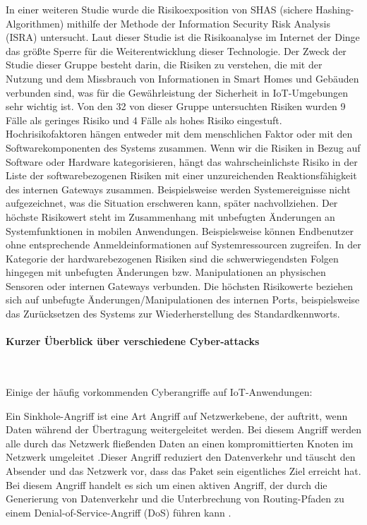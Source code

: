 In einer weiteren Studie \cite{JACOBSSON2016719} wurde die Risikoexposition von SHAS (sichere Hashing-Algorithmen) mithilfe der Methode der Information Security Risk Analysis (ISRA) untersucht.
Laut dieser Studie ist die Risikoanalyse im Internet der Dinge das größte Sperre für die Weiterentwicklung dieser Technologie. Der Zweck der Studie dieser Gruppe besteht darin, die Risiken zu verstehen, die mit der Nutzung und dem Missbrauch von Informationen in Smart Homes und Gebäuden verbunden sind, was für die Gewährleistung der Sicherheit in IoT-Umgebungen sehr wichtig ist. Von den 32 von dieser Gruppe untersuchten Risiken wurden 9 Fälle als geringes Risiko und 4 Fälle als hohes Risiko eingestuft. Hochrisikofaktoren hängen entweder mit dem menschlichen Faktor oder mit den Softwarekomponenten des Systems zusammen. 
Wenn wir die Risiken in Bezug auf Software oder Hardware kategorisieren, hängt das wahrscheinlichste Risiko in der Liste der softwarebezogenen Risiken mit einer unzureichenden Reaktionsfähigkeit des internen Gateways zusammen. Beispielsweise werden Systemereignisse nicht aufgezeichnet, was die Situation erschweren kann, später nachvollziehen. Der höchste Risikowert steht im Zusammenhang mit unbefugten Änderungen an Systemfunktionen in mobilen Anwendungen. Beispielsweise können Endbenutzer ohne entsprechende Anmeldeinformationen auf Systemressourcen zugreifen.
In der Kategorie der hardwarebezogenen Risiken sind die schwerwiegendsten Folgen hingegen mit unbefugten Änderungen bzw. Manipulationen an physischen Sensoren oder internen Gateways verbunden. Die höchsten Risikowerte beziehen sich auf unbefugte Änderungen/Manipulationen des internen Ports, beispielsweise das Zurücksetzen des Systems zur Wiederherstellung des Standardkennworts.

\paragraph{Kurzer Überblick über verschiedene Cyber-attacks}\

Einige der häufig vorkommenden Cyberangriffe auf IoT-Anwendungen:

Ein Sinkhole-Angriff ist eine Art Angriff auf Netzwerkebene, der auftritt, wenn Daten während der Übertragung weitergeleitet werden. Bei diesem Angriff werden alle durch das Netzwerk fließenden Daten an einen kompromittierten Knoten im Netzwerk umgeleitet \cite{7001385} .Dieser Angriff reduziert den Datenverkehr und täuscht den Absender und das Netzwerk vor, dass das Paket sein eigentliches Ziel erreicht hat. Bei diesem Angriff handelt es sich um einen aktiven Angriff, der durch die Generierung von Datenverkehr und die Unterbrechung von Routing-Pfaden zu einem Denial-of-Service-Angriff (DoS) führen kann \cite{stephen2017intrusion} .

